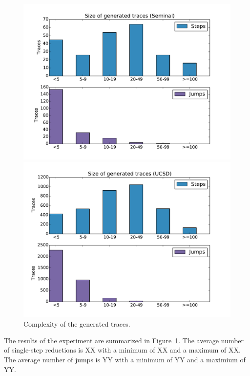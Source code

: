 \begin{figure}[t]
\centering
\begin{minipage}{0.49\linewidth}
\includegraphics[width=\linewidth]{trace_size_seminal.pdf}
\end{minipage}
\begin{minipage}{0.49\linewidth}
\includegraphics[width=\linewidth]{trace_size_ucsd.pdf}
\end{minipage}
\caption{Complexity of the generated traces.}
\label{fig:results-complexity}
\end{figure}
%
The results of the experiment are summarized in
Figure~\ref{fig:results-complexity}.
%
The average number of single-step reductions is XX with a minimum of XX
and a maximum of XX. The average number of jumps is YY with a minimum of
YY and a maximium of YY.

